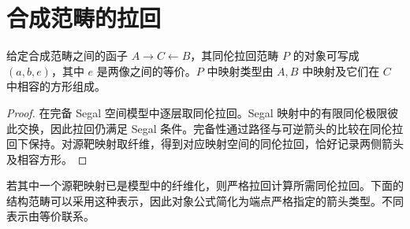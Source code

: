 \section{合成范畴的拉回}
\begin{proposition}[拉回的映射类型]
给定合成范畴之间的函子 $A\to C\leftarrow B$，其同伦拉回范畴 $P$ 的对象可写成 $(a,b,e)$，其中 $e$ 是两像之间的等价。$P$ 中映射类型由 $A,B$ 中映射及它们在 $C$ 中相容的方形组成。
\end{proposition}
\begin{proof}
在完备 Segal 空间模型中逐层取同伦拉回。Segal 映射中的有限同伦极限彼此交换，因此拉回仍满足 Segal 条件。完备性通过路径与可逆箭头的比较在同伦拉回下保持。对源靶映射取纤维，得到对应映射空间的同伦拉回，恰好记录两侧箭头及相容方形。
\end{proof}
\begin{remark}
若其中一个源靶映射已是模型中的纤维化，则严格拉回计算所需同伦拉回。下面的结构范畴可以采用这种表示，因此对象公式简化为端点严格指定的箭头类型。不同表示由等价联系。
\end{remark}

